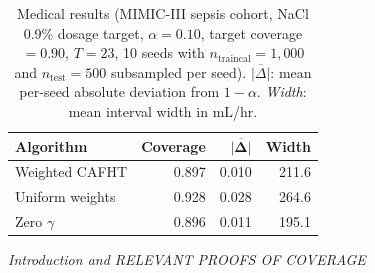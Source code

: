 \documentclass{article}
\numberwithin{equation}{section}
\begin{document}

\begin{table}[ht]
\centering
\small
\setlength{\tabcolsep}{8pt}
\renewcommand{\arraystretch}{1.15}
\caption{%
  Medical results (MIMIC-III sepsis cohort, NaCl 0.9\% dosage target,
  $\alpha=0.10$, target coverage $= 0.90$, $T = 23$, 10 seeds with
  $n_{\mathrm{traincal}} = 1{,}000$ and $n_{\mathrm{test}} = 500$ subsampled
  per seed).  $\overline{|\Delta|}$: mean per-seed absolute deviation from
  $1-\alpha$.  \textit{Width}: mean interval width in mL/hr.
}
\label{tab:medical}
\begin{tabular}{@{} lrrr @{}}
\toprule
{\bfseries Algorithm}
  & {\bfseries Coverage} & $\boldsymbol{\overline{|\Delta|}}$ & {\bfseries Width} \\
\midrule
Weighted CAFHT      & 0.897 & 0.010 & 211.6 \\
Uniform weights     & 0.928 & 0.028 & 264.6 \\
Zero $\gamma$       & 0.896 & 0.011 & 195.1 \\
\bottomrule
\end{tabular}
\end{table}





\textit{Introduction and RELEVANT PROOFS OF COVERAGE}
\end{document}

